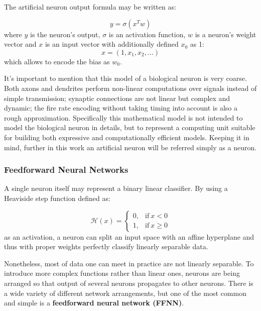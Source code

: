 \documentclass[thesis=B,english]{FITthesis}[2019/12/23]
\begin{document}
	The artificial neuron output formula may be written as:
	
	\[y = \sigma(x^Tw)\]
	where $y$ is the neuron's output, $\sigma$ is an activation function, $w$ is a neuron's weight vector and $x$ is an input vector with additionally defined $x_0$ as 1:
	\[x = (1, x_1, x_2,\dots)\]
	which allows to encode the bias as $w_0$.
	
	It's important to mention that this model of a biological neuron is very coarse. Both axons and dendrites perform non-linear computations over signals instead of simple transmission; synaptic connections are not linear but complex and dynamic; the fire rate encoding without taking timing into account is also a rough approximation. Specifically this mathematical model is not intended to model the biological neuron in details, but to represent a computing unit suitable for building both expressive and computationally efficient models. Keeping it in mind, further in this work an artificial neuron will be referred simply as a neuron.
	
	\subsubsection{Feedforward Neural Networks}
	A single neuron itself may represent a binary linear classifier. By using a Heaviside step function defined as:
	
	\[
	\mathcal{H}(x) = 
	\begin{cases}
	0, & \text{if}\ x<0 \\
	1, & \text{if}\ x \geq 0
	\end{cases}
	\]
	as an activation, a neuron can split an input space with an affine hyperplane and thus with proper weights perfectly classify linearly separable data.
	
	Nonetheless, most of data one can meet in practice are not linearly separable. To introduce more complex functions rather than linear ones, neurons are being arranged so that output of several neurons propagates to other neurons. There is a wide variety of different network arrangements\cite{nn_zoo}, but one of the most common and simple is a \textbf{feedforward neural network (FFNN)}.
	
\end{document}
